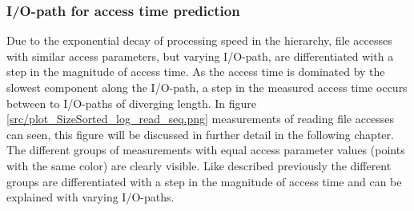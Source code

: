 \documentclass{superfri}
\begin{document}
\subsubsection{I/O-path for access time prediction}
\label{sec:path_for_pred}
Due to the exponential decay of processing speed in the hierarchy, file accesses with similar access parameters, but varying I/O-path, are differentiated with a step in the magnitude of access time.
As the access time is dominated by the slowest component along the I/O-path, a step in the measured access time occurs between to I/O-paths of diverging length.
In figure \ref{src/plot_SizeSorted_log_read_seq.png} measurements of reading file accesses can seen, this figure will be discussed in further detail in the following chapter.
\\
The different groups of measurements with equal access parameter values (points with the same color) are clearly visible.
Like described previously the different groups are differentiated with a step in the magnitude of access time and can be explained with varying I/O-paths.
\end{document}
